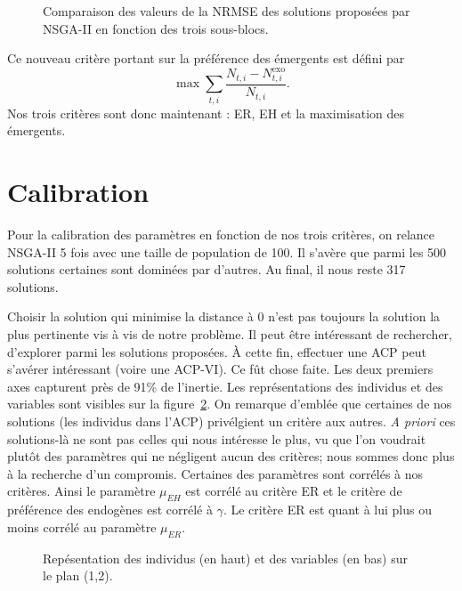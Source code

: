 \documentclass[a4paper, 11pt]{article}
\begin{document}
\begin{figure}[ht]
 \centering
 \caption{Comparaison des valeurs de la NRMSE des solutions proposées par NSGA-II en fonction des trois sous-blocs.}
 \label{fig:cost}
\end{figure}



Ce nouveau critère portant sur la préférence des émergents est défini par 
$$
\max \sum_{t, i}\frac{N_{t,i} - N_{t, i}^{\text{exo}}}{N_{t, i}}.
$$
Nos trois critères sont donc maintenant : ER, EH et la maximisation des émergents.


\section{Calibration}

Pour la calibration des paramètres en fonction de nos trois critères, on relance NSGA-II 5 fois avec une taille de population de 100. Il s'avère que parmi les 500 solutions certaines sont dominées par d'autres. Au final, il nous reste 317 solutions.

Choisir la solution qui minimise la distance à 0 n'est pas toujours la solution la plus pertinente vis à vis de notre problème. Il peut être intéressant de rechercher, d'explorer parmi les solutions proposées. À cette fin, effectuer une ACP peut s'avérer intéressant (voire une ACP-VI). Ce fût chose faite. Les deux premiers axes capturent près de 91\% de l'inertie. Les représentations des individus et des variables sont visibles sur la figure~\ref{fig:pca}. On remarque d'emblée que certaines de nos solutions (les individus dans l'ACP) privélgient un critère aux autres. \textit{A priori} ces solutions-là ne sont pas celles qui nous intéresse le plus, vu que l'on voudrait plutôt des paramètres qui ne négligent aucun des critères; nous sommes donc plus à la recherche d'un compromis. Certaines des paramètres sont corrélés à nos critères. Ainsi le paramètre $\mu_{EH}$ est corrélé au critère ER et le critère de préférence des endogènes est corrélé à $\gamma$. Le critère ER est quant à lui plus ou moins corrélé au paramètre $\mu_{ER}$.


\begin{figure}[ht]
 \centering
 
 
 \caption{Repésentation des individus (en haut) et des variables (en bas) sur le plan (1,2).}
 
 \label{fig:pca}
\end{figure}
\end{document}
